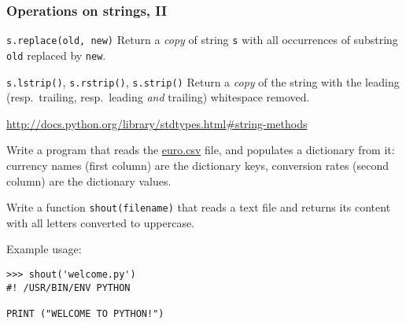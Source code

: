 \documentclass[english,serif,mathserif,xcolor=pdftex,dvipsnames,table]{beamer}
\begin{document}
\begin{frame}[fragile]
  \frametitle{Operations on strings, II}
  \begin{describe}{\lstinline|s.replace(old, new)|}
    Return a \emph{copy} of string \texttt{s} with all occurrences of
    substring \texttt{old} replaced by \texttt{new}.
  \end{describe}

  \begin{describe}{%
      \lstinline|s.lstrip()|,
      \lstinline|s.rstrip()|,
      \lstinline|s.strip()|}
    Return a \emph{copy} of the string with the leading (resp.\ trailing,
    resp.\ leading \emph{and} trailing) whitespace removed.
  \end{describe}

  \begin{references}
    \url{http://docs.python.org/library/stdtypes.html#string-methods}
  \end{references}
\end{frame}


\begin{frame}[fragile]
  \begin{exercise}
    Write a program that reads the \href{https://raw.github.com/gc3-uzh-ch/python-course/master/euro.csv}{euro.csv} file, and populates a dictionary from it: currency names (first column) are the dictionary keys, conversion rates (second column) are the dictionary values.
  \end{exercise}

  \+
  \begin{exercise}
    Write a function \lstinline|shout(filename)| that reads a text file and
    returns its content with all letters converted to uppercase.

    \+
    Example usage:
\begin{lstlisting}
>>> shout('welcome.py')
#! /USR/BIN/ENV PYTHON

PRINT ("WELCOME TO PYTHON!")
\end{lstlisting}
  \end{exercise}
\end{frame}
\end{document}
